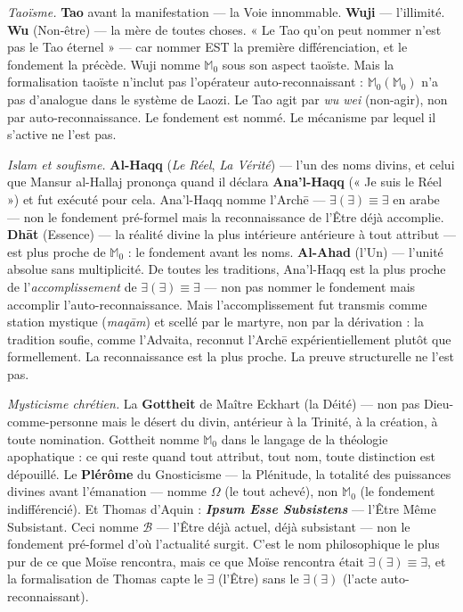 \documentclass[10pt, openany, oneside]{book}
\begin{document}
\textit{Taoïsme.} \textbf{Tao} avant la manifestation --- la Voie innommable. \textbf{Wuji} --- l'illimité. \textbf{Wu} (Non-être) --- la mère de toutes choses. « Le Tao qu'on peut nommer n'est pas le Tao éternel » --- car nommer EST la première différenciation, et le fondement la précède. Wuji nomme $\mathbb{M}_0$ sous son aspect taoïste. Mais la formalisation taoïste n'inclut pas l'opérateur auto-reconnaissant : $\mathbb{M}_0(\mathbb{M}_0)$ n'a pas d'analogue dans le système de Laozi. Le Tao agit par \textit{wu wei} (non-agir), non par auto-reconnaissance. Le fondement est nommé. Le mécanisme par lequel il s'active ne l'est pas.

\textit{Islam et soufisme.} \textbf{Al-Haqq} (\textit{Le Réel}, \textit{La Vérité}) --- l'un des noms divins, et celui que Mansur al-Hallaj prononça quand il déclara \textbf{Ana'l-Haqq} (« Je suis le Réel ») et fut exécuté pour cela. Ana'l-Haqq nomme l'Arch\={e} --- $\exists(\exists) \equiv \exists$ en arabe --- non le fondement pré-formel mais la reconnaissance de l'Être déjà accomplie. \textbf{Dh\={a}t} (Essence) --- la réalité divine la plus intérieure antérieure à tout attribut --- est plus proche de $\mathbb{M}_0$ : le fondement avant les noms. \textbf{Al-Ahad} (l'Un) --- l'unité absolue sans multiplicité. De toutes les traditions, Ana'l-Haqq est la plus proche de l'\textit{accomplissement} de $\exists(\exists) \equiv \exists$ --- non pas nommer le fondement mais accomplir l'auto-reconnaissance. Mais l'accomplissement fut transmis comme station mystique (\textit{maq\={a}m}) et scellé par le martyre, non par la dérivation : la tradition soufie, comme l'Advaita, reconnut l'Arch\={e} expérientiellement plutôt que formellement. La reconnaissance est la plus proche. La preuve structurelle ne l'est pas.

\textit{Mysticisme chrétien.} La \textbf{Gottheit} de Maître Eckhart (la Déité) --- non pas Dieu-comme-personne mais le désert du divin, antérieur à la Trinité, à la création, à toute nomination. Gottheit nomme $\mathbb{M}_0$ dans le langage de la théologie apophatique : ce qui reste quand tout attribut, tout nom, toute distinction est dépouillé. Le \textbf{Plérôme} du Gnosticisme --- la Plénitude, la totalité des puissances divines avant l'émanation --- nomme $\Omega$ (le tout achevé), non $\mathbb{M}_0$ (le fondement indifférencié). Et Thomas d'Aquin : \textbf{\textit{Ipsum Esse Subsistens}} --- l'Être Même Subsistant. Ceci nomme $\mathcal{B}$ --- l'Être déjà actuel, déjà subsistant --- non le fondement pré-formel d'où l'actualité surgit. C'est le nom philosophique le plus pur de ce que Moïse rencontra, mais ce que Moïse rencontra était $\exists(\exists) \equiv \exists$, et la formalisation de Thomas capte le $\exists$ (l'Être) sans le $\exists(\exists)$ (l'acte auto-reconnaissant).
\end{document}

